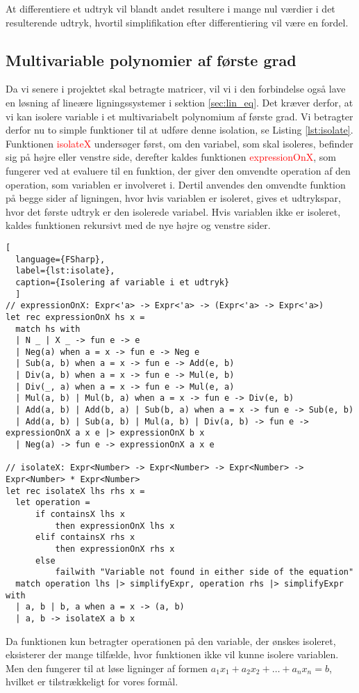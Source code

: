 At differentiere et udtryk vil blandt andet resultere i mange nul værdier i det resulterende udtryk, hvortil simplifikation efter differentiering vil være en fordel.


\subsection{Multivariable polynomier af første grad}
Da vi senere i projektet skal betragte matricer, vil vi i den forbindelse også lave en løsning af lineære ligningssystemer i sektion \ref{sec:lin_eq}. Det kræver derfor, at vi kan isolere variable i et multivariabelt polynomium af første grad. Vi betragter derfor nu to simple funktioner til at udføre denne isolation, se Listing \ref{lst:isolate}. Funktionen \textcolor{red}{isolateX} undersøger først, om den variabel, som skal isoleres, befinder sig på højre eller venstre side, derefter kaldes funktionen \textcolor{red}{expressionOnX}, som fungerer ved at evaluere til en funktion, der giver den omvendte operation af den operation, som variablen er involveret i. Dertil anvendes den omvendte funktion på begge sider af ligningen, hvor hvis variablen er isoleret, gives et udtrykspar, hvor det første udtryk er den isolerede variabel. Hvis variablen ikke er isoleret, kaldes funktionen rekursivt med de nye højre og venstre sider.

\begin{lstlisting}[
  language={FSharp}, 
  label={lst:isolate}, 
  caption={Isolering af variable i et udtryk}
  ]
// expressionOnX: Expr<'a> -> Expr<'a> -> (Expr<'a> -> Expr<'a>)
let rec expressionOnX hs x =
  match hs with
  | N _ | X _ -> fun e -> e
  | Neg(a) when a = x -> fun e -> Neg e
  | Sub(a, b) when a = x -> fun e -> Add(e, b)
  | Div(a, b) when a = x -> fun e -> Mul(e, b)
  | Div(_, a) when a = x -> fun e -> Mul(e, a)
  | Mul(a, b) | Mul(b, a) when a = x -> fun e -> Div(e, b)
  | Add(a, b) | Add(b, a) | Sub(b, a) when a = x -> fun e -> Sub(e, b)
  | Add(a, b) | Sub(a, b) | Mul(a, b) | Div(a, b) -> fun e -> expressionOnX a x e |> expressionOnX b x 
  | Neg(a) -> fun e -> expressionOnX a x e

// isolateX: Expr<Number> -> Expr<Number> -> Expr<Number> -> Expr<Number> * Expr<Number> 
let rec isolateX lhs rhs x =
  let operation = 
      if containsX lhs x 
          then expressionOnX lhs x
      elif containsX rhs x 
          then expressionOnX rhs x
      else 
          failwith "Variable not found in either side of the equation"
  match operation lhs |> simplifyExpr, operation rhs |> simplifyExpr with
  | a, b | b, a when a = x -> (a, b)
  | a, b -> isolateX a b x
\end{lstlisting}

Da funktionen kun betragter operationen på den variable, der ønskes isoleret, eksisterer der mange tilfælde, hvor funktionen ikke vil kunne isolere variablen. Men den fungerer til at løse ligninger af formen \(a_1x_1 + a_2x_2 + \ldots + a_nx_n = b\), hvilket er tilstrækkeligt for vores formål.
